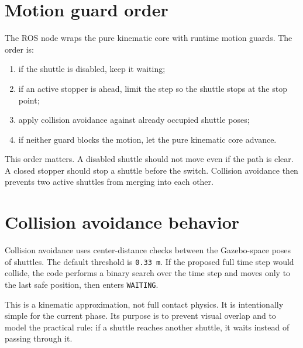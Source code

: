 \documentclass[12pt,a4paper]{report}
\newcommand{\codenext}[1]{\par\Needspace{#1\baselineskip}}
\begin{document}
\section{Motion guard order}

The ROS node wraps the pure kinematic core with runtime motion guards. The
order is:

\begin{enumerate}
\item if the shuttle is disabled, keep it waiting;
\item if an active stopper is ahead, limit the step so the shuttle stops at the
stop point;
\item apply collision avoidance against already occupied shuttle poses;
\item if neither guard blocks the motion, let the pure kinematic core advance.
\end{enumerate}

\codenext{36}


This order matters. A disabled shuttle should not move even if the path is
clear. A closed stopper should stop a shuttle before the switch. Collision
avoidance then prevents two active shuttles from merging into each other.

\section{Collision avoidance behavior}

Collision avoidance uses center-distance checks between the Gazebo-space poses
of shuttles. The default threshold is \texttt{0.33 m}. If the proposed full
time step would collide, the code performs a binary search over the time step
and moves only to the last safe position, then enters \texttt{WAITING}.

\codenext{34}


This is a kinematic approximation, not full contact physics. It is intentionally
simple for the current phase. Its purpose is to prevent visual overlap and to
model the practical rule: if a shuttle reaches another shuttle, it waits instead
of passing through it.
\end{document}

